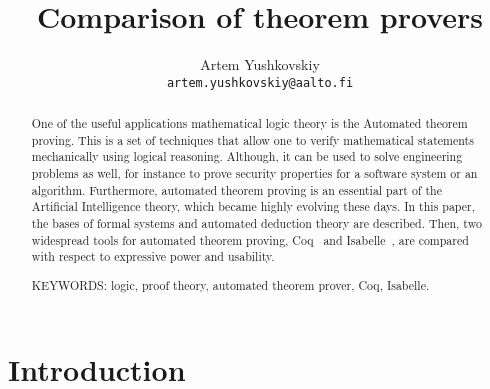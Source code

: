 \documentclass[article]{aaltoseries}
\begin{document}
 

\title{Comparison of theorem provers}

\author{Artem Yushkovskiy
\\\textnormal{\texttt{artem.yushkovskiy@aalto.fi}}}


\maketitle


\begin{abstract}
One of the useful applications mathematical logic theory is the Automated theorem proving. This is a set of techniques that allow one to verify mathematical statements mechanically using logical reasoning. Although, it can be used to solve engineering problems as well, for instance to prove security properties for a software system or an algorithm. Furthermore, automated theorem proving is an essential part of the Artificial Intelligence theory, which became highly evolving these days. In this paper, the bases of formal systems and automated deduction theory are described. Then, two widespread tools for automated theorem proving, Coq~\cite{Coq} and Isabelle~\cite{Isabelle}, are compared with respect to expressive power and usability.

\vspace{3mm}
\noindent KEYWORDS: logic, proof theory, automated theorem prover, Coq, Isabelle.

\end{abstract}




\section{Introduction}
\end{document}
